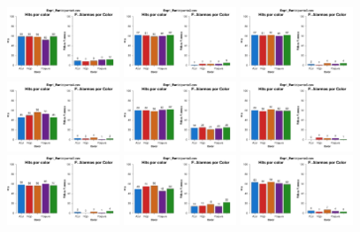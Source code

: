 \documentclass[a4paper ]{article}
\begin{document}
\begin{figure}[th]
\centering
\includegraphics[width=0.3\textwidth]{Figures/Color_Exp1_P1} \includegraphics[width=0.3\textwidth]{Figures/Color_Exp1_P2} \includegraphics[width=0.3\textwidth]{Figures/Color_Exp1_P3}
\includegraphics[width=0.3\textwidth]{Figures/Color_Exp1_P4} \includegraphics[width=0.3\textwidth]{Figures/Color_Exp1_P5} \includegraphics[width=0.3\textwidth]{Figures/Color_Exp1_P6}
\includegraphics[width=0.3\textwidth]{Figures/Color_Exp1_P7} \includegraphics[width=0.3\textwidth]{Figures/Color_Exp1_P8} \includegraphics[width=0.3\textwidth]{Figures/Color_Exp1_P9}

\end{figure}
\end{document}
